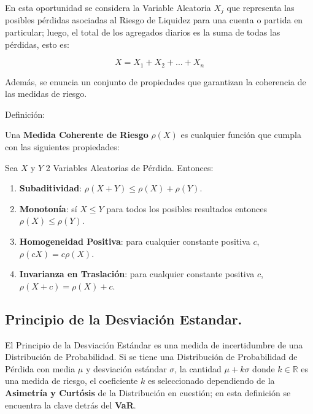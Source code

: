 \documentclass[10pt,]{article}
\providecommand{\tightlist}{%
  \setlength{\itemsep}{0pt}\setlength{\parskip}{0pt}}
\begin{document}
En esta oportunidad se considera la Variable Aleatoria \(X_j\) que
representa las posibles pérdidas asociadas al Riesgo de Liquidez para
una cuenta o partida en particular; luego, el total de los agregados
diarios es la suma de todas las pérdidas, esto es:

\[X=X_1+X_2+...+X_n\]

Además, se enuncia un conjunto de propiedades que garantizan la
coherencia de las medidas de riesgo.

Definición:

Una \textbf{Medida Coherente de Riesgo} \(\rho(X)\) es cualquier función
que cumpla con las siguientes propiedades:

Sea \(X\) y \(Y\) 2 Variables Aleatorias de Pérdida. Entonces:

\begin{enumerate}
\def\labelenumi{\arabic{enumi})}
\tightlist
\item
  \textbf{Subaditividad}: \(\rho(X+Y) \leq \rho(X)+\rho(Y)\).\\
\item
  \textbf{Monotonía}: sí \(X \leq Y\) para todos los posibles resultados
  entonces \(\rho(X)\leq\rho(Y)\).\\
\item
  \textbf{Homogeneidad Positiva}: para cualquier constante positiva
  \(c\), \(\rho(cX)=c\rho(X)\).\\
\item
  \textbf{Invarianza en Traslación}: para cualquier constante positiva
  \(c\), \(\rho(X+c)=\rho(X)+c\).
\end{enumerate}

\hypertarget{principio-de-la-desviacion-estandar.}{%
\subsection{\texorpdfstring{\textbf{Principio de la Desviación
Estandar.}}{Principio de la Desviación Estandar.}}\label{principio-de-la-desviacion-estandar.}}

El Principio de la Desviación Estándar es una medida de incertidumbre de
una Distribución de Probabilidad. Si se tiene una Distribución de
Probabilidad de Pérdida con media \(\mu\) y desviación estándar
\(\sigma\), la cantidad \(\mu+k\sigma\) donde \(k\in \mathbb{R}\) es una
medida de riesgo, el coeficiente \(k\) es seleccionado dependiendo de la
\textbf{Asimetría y Curtósis} de la Distribución en cuestión; en esta
definición se encuentra la clave detrás del \textbf{VaR}.
\end{document}
